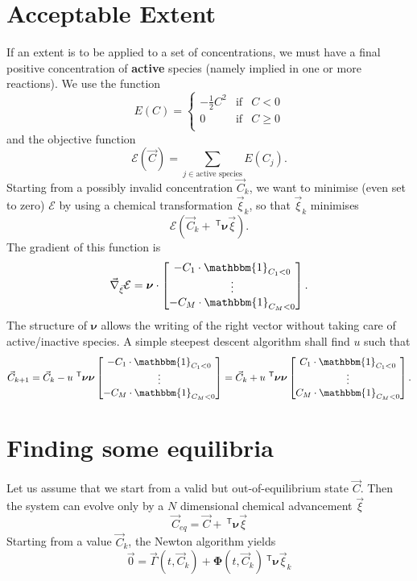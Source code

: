 \documentclass[aps]{revtex4}
\newcommand{\mymat}[1]{\bm{#1}}
\newcommand{\mytrn}[1]{~^{\mathsf{T}}{#1}}
\newcommand{\mygrad}{\vec{\nabla}}
\begin{document}
\section{Acceptable Extent}
If an extent is to be applied to a set of concentrations, we must have
a final positive concentration of \textbf{active} species (namely implied in one or more reactions).
We use the function
$$
	E(C) = 
	\left\lbrace
	\begin{array}{rcl}
	-\frac{1}{2} C^2 & \text{if} & C < 0\\
	0 & \text{if} & C \geq 0\\
	\end{array}
	\right.
$$
and the objective function
$$
	\mathcal{E}(\vec{C}) = \sum_{j\in\text{active species}} E(C_j).
$$
Starting from a possibly invalid concentration $\vec{C}_k$, 
we want to minimise (even set to zero) $\mathcal{E}$ by using a chemical transformation $\vec{\xi}_k$, so 
that $\vec{\xi}_k$ minimises 
$$
	\mathcal{E}(\vec{C}_k + \mytrn{\mymat{\nu}}\vec{\xi}).
$$
The gradient of this function is
$$
	\mygrad_{\vec{\xi}} \mathcal{E} = \mymat{\nu} \cdot
	\begin{bmatrix}
	-C_1 \cdot \mathbbm{1}_{C_1<0} \\
	\vdots\\
	-C_M \cdot \mathbbm{1}_{C_M<0}\\
	\end{bmatrix}.
$$
The structure of $\mymat{\nu}$ allows the writing of the right vector without taking care of active/inactive species.
A simple steepest descent algorithm shall find $u$ such that
$$
	\vec{C}_{k+1} = \vec{C}_k - u \mytrn{\mymat{\nu}} \mymat{\nu} \begin{bmatrix}
	-C_1 \cdot \mathbbm{1}_{C_1<0} \\
	\vdots\\
	-C_M \cdot \mathbbm{1}_{C_M<0}\\
	\end{bmatrix} =
	\vec{C}_k + u \mytrn{\mymat{\nu}} \mymat{\nu} \begin{bmatrix}
	C_1 \cdot \mathbbm{1}_{C_1<0} \\
	\vdots\\
	C_M \cdot \mathbbm{1}_{C_M<0}\\
	\end{bmatrix}
	.
$$

\section{Finding some equilibria}

Let us assume that we start from a valid but out-of-equilibrium state $\vec{C}$.
Then the system can evolve only by a $N$ dimensional chemical advancement $\vec{\xi}$
\begin{equation}
	\vec{C}_{eq} = \vec{C} + \mytrn{\mymat{\nu}}\vec{\xi}
\end{equation}
Starting from a value $\vec{C}_{k}$, the Newton algorithm yields
\begin{equation}
	\vec{0} = \vec{\Gamma}(t,\vec{C}_k) + \mymat{\Phi}(t,\vec{C}_k) \mytrn{\mymat{\nu}}\vec{\xi}_k
\end{equation}
\end{document}
